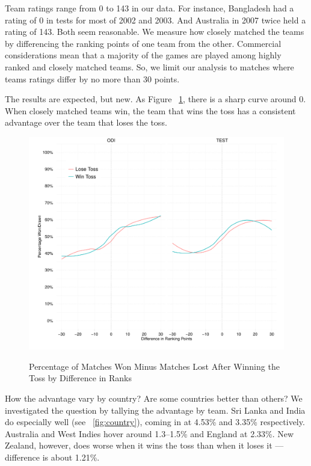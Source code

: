 \documentclass[12pt]{article}
\begin{document}
Team ratings range from 0 to 143 in our data. For instance, Bangladesh had a rating of 0 in tests for most of 2002 and 2003. And Australia in 2007 twice held a rating of 143. Both seem reasonable. We measure how closely matched the teams by differencing the ranking points of one team from the other. Commercial considerations mean that a majority of the games are played among highly ranked and closely matched teams. So, we limit our analysis to matches where teams ratings differ by no more than 30 points.

The results are expected, but new. As Figure ~\ref{fig:ranks}, there is a sharp curve around 0. When closely matched teams win, the team that wins the toss has a consistent advantage over the team that loses the toss. 

\begin{figure}[htbp]
\centering
\caption{Percentage of Matches Won Minus Matches Lost After Winning the Toss by Difference in Ranks}
\includegraphics[width=1\textwidth]{../figs/winbyRank.pdf}
\label{fig:ranks}
\end{figure}

How the advantage vary by country? Are some countries better than others? We investigated the question by tallying the advantage by team. Sri Lanka and India do especially well (see ~\ref{fig:country}), coming in at 4.53\% and 3.35\% respectively. Australia and West Indies hover around 1.3--1.5\% and England at 2.33\%. New Zealand, however, does worse when it wins the toss than when it loses it --- difference is about 1.21\%.
\end{document}
